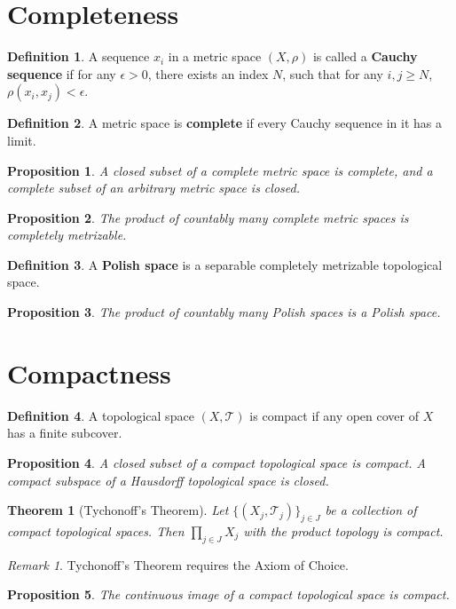 \documentclass[openany]{book}
\newtheorem{proposition}{Proposition}[chapter]
\newtheorem{theorem}{Theorem}[chapter]
\theoremstyle{definition}
\newtheorem{definition}{Definition}[chapter]
\theoremstyle{remark}
\newtheorem*{remark}{Remark}
\begin{document}
\section{Completeness}
\begin{definition}
    A sequence $x_i$ in a metric space $(X,\rho)$ is called a \textbf{Cauchy sequence} if for any $\epsilon>0$, there exists an index $N$, such that for any $i,j\ge N$, $\rho(x_i,x_j)<\epsilon$.
\end{definition}
\begin{definition}
    A metric space is \textbf{complete} if every Cauchy sequence in it has a limit.
\end{definition}
\begin{proposition}
    A closed subset of a complete metric space is complete, and a complete subset of an arbitrary metric space is closed.
\end{proposition}
\begin{proposition}
    The product of countably many complete metric spaces is completely metrizable.
\end{proposition}
\begin{definition}
    A \textbf{Polish space} is a separable completely metrizable topological space.
\end{definition}
\begin{proposition}
    The product of countably many Polish spaces is a Polish space.
\end{proposition}

\section{Compactness}
\begin{definition}
    A topological space $(X,\mathcal{T})$ is compact if any open cover of $X$ has a finite subcover.
\end{definition}
\begin{proposition}
    A closed subset of a compact topological space is compact. A compact subspace of a Hausdorff topological space is closed.
\end{proposition}
\begin{theorem}[Tychonoff's Theorem]
    Let $\{(X_j,\mathcal{T}_j)\}_{j\in J}$ be a collection of compact topological spaces. Then $\prod_{j\in J}X_j$ with the product topology is compact.
\end{theorem}
\begin{remark}
    Tychonoff's Theorem requires the Axiom of Choice.
\end{remark}
\begin{proposition}
    The continuous image of a compact topological space is compact.
\end{proposition}
\end{document}
